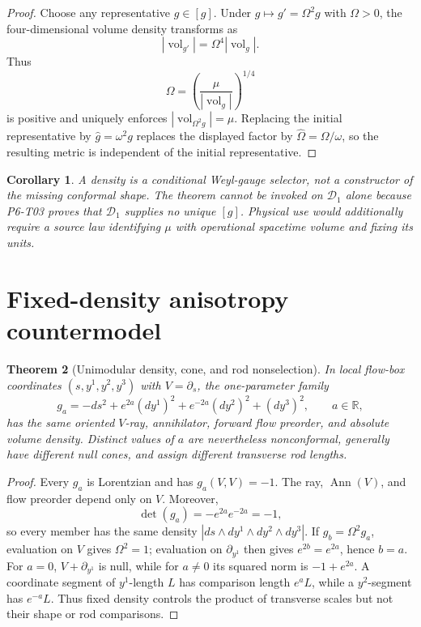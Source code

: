\documentclass[11pt]{article}
\newtheorem{theorem}{Theorem}
\newtheorem{corollary}[theorem]{Corollary}
\newcommand{\Ann}{\operatorname{Ann}}
\newcommand{\vol}{\operatorname{vol}}
\begin{document}
\begin{proof}
Choose any representative \(g\in[g]\).  Under \(g\mapsto g'=\Omega^2g\)
with \(\Omega>0\), the four-dimensional volume density transforms as
\[
  |\vol_{g'}|=\Omega^4|\vol_g|.
\]
Thus
\[
  \Omega=\left(\frac{\mu}{|\vol_g|}\right)^{1/4}
\]
is positive and uniquely enforces \(|\vol_{\Omega^2g}|=\mu\).  Replacing the
initial representative by \(\widehat g=\omega^2g\) replaces the displayed
factor by \(\widehat\Omega=\Omega/\omega\), so the resulting metric is
independent of the initial representative.
\end{proof}

\begin{corollary}
A density is a conditional Weyl-gauge selector, not a constructor of the
missing conformal shape.  The theorem cannot be invoked on
\(\mathcal D_1\) alone because P6-T03 proves that \(\mathcal D_1\) supplies no
unique \([g]\).  Physical use would additionally require a source law
identifying \(\mu\) with operational spacetime volume and fixing its units.
\end{corollary}

\section{Fixed-density anisotropy countermodel}

\begin{theorem}[Unimodular density, cone, and rod nonselection]
\label{thm:unimodular}
In local flow-box coordinates \((s,y^1,y^2,y^3)\) with \(V=\partial_s\), the
one-parameter family
\[
  g_a=-ds^2+e^{2a}(dy^1)^2+e^{-2a}(dy^2)^2+(dy^3)^2,
  \qquad a\in\mathbb R,
\]
has the same oriented \(V\)-ray, annihilator, forward flow preorder, and
absolute volume density.  Distinct values of \(a\) are nevertheless
nonconformal, generally have different null cones, and assign different
transverse rod lengths.
\end{theorem}

\begin{proof}
Every \(g_a\) is Lorentzian and has \(g_a(V,V)=-1\).  The ray,
\(\Ann(V)\), and flow preorder depend only on \(V\).  Moreover,
\[
 \det(g_a)=-e^{2a}e^{-2a}=-1,
\]
so every member has the same density
\(|ds\wedge dy^1\wedge dy^2\wedge dy^3|\).
If \(g_b=\Omega^2g_a\), evaluation on \(V\) gives \(\Omega^2=1\); evaluation
on \(\partial_{y^1}\) then gives \(e^{2b}=e^{2a}\), hence \(b=a\).
For \(a=0\), \(V+\partial_{y^1}\) is null, while for \(a\ne0\) its squared
norm is \(-1+e^{2a}\).  A coordinate segment of \(y^1\)-length \(L\) has
comparison length \(e^aL\), while a \(y^2\)-segment has \(e^{-a}L\).
Thus fixed density controls the product of transverse scales but not their
shape or rod comparisons.
\end{proof}
\end{document}
